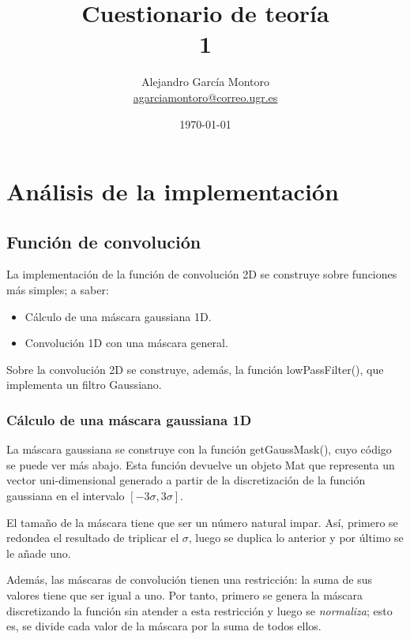 \documentclass[a4paper, 11pt]{article}
\title{Cuestionario de teoría \\ 1}
\author{Alejandro García Montoro\\
    \href{mailto:agarciamontoro@correo.ugr.es}{agarciamontoro@correo.ugr.es}}
\date{\today}
\theoremstyle{definition}
\theoremstyle{theorem}
\begin{document}
  \maketitle

  \section{Análisis de la implementación}

  \subsection{Función de convolución}

  La implementación de la función de convolución 2D se construye sobre funciones más simples; a saber:
  \begin{itemize}
      \item Cálculo de una máscara gaussiana 1D.
      \item Convolución 1D con una máscara general.
  \end{itemize}

  Sobre la convolución 2D se construye, además, la función lowPassFilter(), que implementa un filtro Gaussiano.

  \subsubsection{Cálculo de una máscara gaussiana 1D}
  La máscara gaussiana se construye con la función getGaussMask(), cuyo código se puede ver más abajo. Esta función devuelve un objeto Mat que representa un vector uni-dimensional generado a partir de la discretización de la función gaussiana en el intervalo $[-3\sigma, 3\sigma]$.

  El tamaño de la máscara tiene que ser un número natural impar. Así, primero se redondea el resultado de triplicar el $\sigma$, luego se duplica lo anterior y por último se le añade uno.

  Además, las máscaras de convolución tienen una restricción: la suma de sus valores tiene que ser igual a uno. Por tanto, primero se genera la máscara discretizando la función sin atender a esta restricción y luego se \emph{normaliza}; esto es, se divide cada valor de la máscara por la suma de todos ellos.
\end{document}
